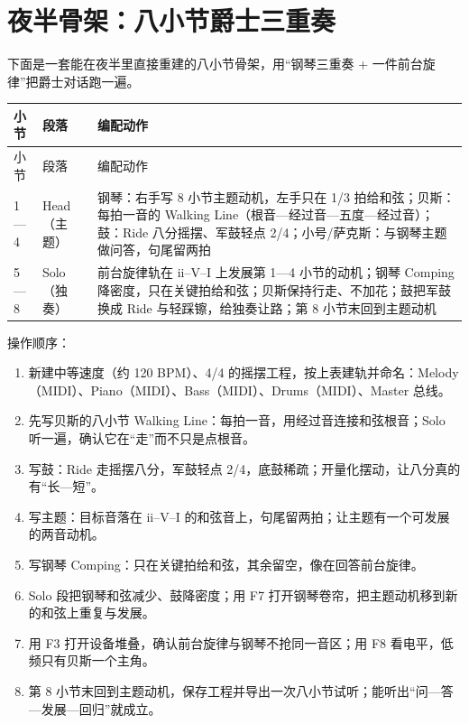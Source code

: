 \section{夜半骨架：八小节爵士三重奏}
\label{sec:jazz-yeban}

下面是一套能在夜半里直接重建的八小节骨架，用“钢琴三重奏 + 一件前台旋律”把爵士对话跑一遍。

\begin{longtable}{p{}p{}p{}}
\toprule
小节 & 段落 & 编配动作 \\
\midrule
\endfirsthead
\toprule
小节 & 段落 & 编配动作 \\
\midrule
\endhead
1—4 & Head（主题） & 钢琴：右手写 8 小节主题动机，左手只在 1/3 拍给和弦；贝斯：每拍一音的 Walking Line（根音—经过音—五度—经过音）；鼓：Ride 八分摇摆、军鼓轻点 2/4；小号/萨克斯：与钢琴主题做问答，句尾留两拍 \\
5—8 & Solo（独奏） & 前台旋律轨在 ii–V–I 上发展第 1—4 小节的动机；钢琴 Comping 降密度，只在关键拍给和弦；贝斯保持行走、不加花；鼓把军鼓换成 Ride 与轻踩镲，给独奏让路；第 8 小节末回到主题动机 \\
\bottomrule
\end{longtable}

操作顺序：

\begin{sloppypar}
\begin{enumerate}
\item 新建中等速度（约 120 BPM）、4/4 的摇摆工程，按上表建轨并命名：Melody（MIDI）、Piano（MIDI）、Bass（MIDI）、Drums（MIDI）、Master 总线。
\item 先写贝斯的八小节 Walking Line：每拍一音，用经过音连接和弦根音；Solo 听一遍，确认它在“走”而不只是点根音。
\item 写鼓：Ride 走摇摆八分，军鼓轻点 2/4，底鼓稀疏；开量化摆动，让八分真的有“长—短”。
\item 写主题：目标音落在 ii–V–I 的和弦音上，句尾留两拍；让主题有一个可发展的两音动机。
\item 写钢琴 Comping：只在关键拍给和弦，其余留空，像在回答前台旋律。
\item Solo 段把钢琴和弦减少、鼓降密度；用 F7 打开钢琴卷帘，把主题动机移到新的和弦上重复与发展。
\item 用 F3 打开设备堆叠，确认前台旋律与钢琴不抢同一音区；用 F8 看电平，低频只有贝斯一个主角。
\item 第 8 小节末回到主题动机，保存工程并导出一次八小节试听；能听出“问—答—发展—回归”就成立。
\end{enumerate}
\end{sloppypar}

